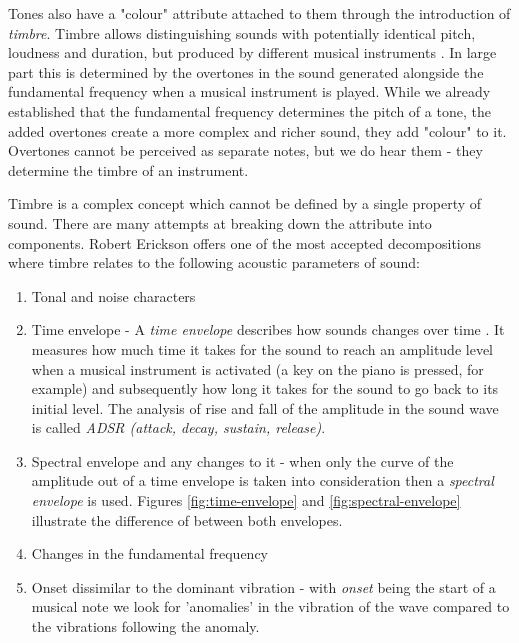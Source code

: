 Tones also have a "colour" attribute attached to them through the introduction
of \textit{timbre}. Timbre allows distinguishing sounds with potentially
identical pitch, loudness and duration, but produced by different musical
instruments \cite{klapuri2007signal}. In large part this is determined by the
overtones in the sound generated alongside the fundamental frequency when a
musical instrument is played. While we already established that the fundamental
frequency determines the pitch of a tone, the added overtones create a more
complex and richer sound, they add "colour" to it. Overtones cannot be perceived
as separate notes, but we do hear them - they determine the timbre of an
instrument.

Timbre is a complex concept which cannot be defined by a single property of
sound. There are many attempts at breaking down the attribute into components.
Robert Erickson \cite{erickson1975sound} offers one of the most accepted
decompositions where timbre relates to the following acoustic parameters of
sound:
\begin{enumerate}
    \item Tonal and noise characters
    \item Time envelope - A \textit{time envelope} describes how sounds changes
    over time \cite{wiki:envelope}. It measures how much time it takes for the
    sound to reach an amplitude level when a musical instrument is activated (a
    key on the piano is pressed, for example) and subsequently how long it takes
    for the sound to go back to its initial level. The analysis of rise and fall
    of the amplitude in the sound wave is called \textit{ADSR (attack, decay,
    sustain, release)}.
    \item Spectral envelope and any changes to it - when only the curve of the
    amplitude out of a time envelope is taken into consideration then a
    \textit{spectral envelope} is used. Figures \ref{fig:time-envelope} and
    \ref{fig:spectral-envelope} illustrate the difference of between both envelopes.
    \item Changes in the fundamental frequency
    \item Onset dissimilar to the dominant vibration - with \textit{onset}
    being the start of a musical note we look for 'anomalies' in
    the vibration of the wave compared to the vibrations following the anomaly.

\end{enumerate}

